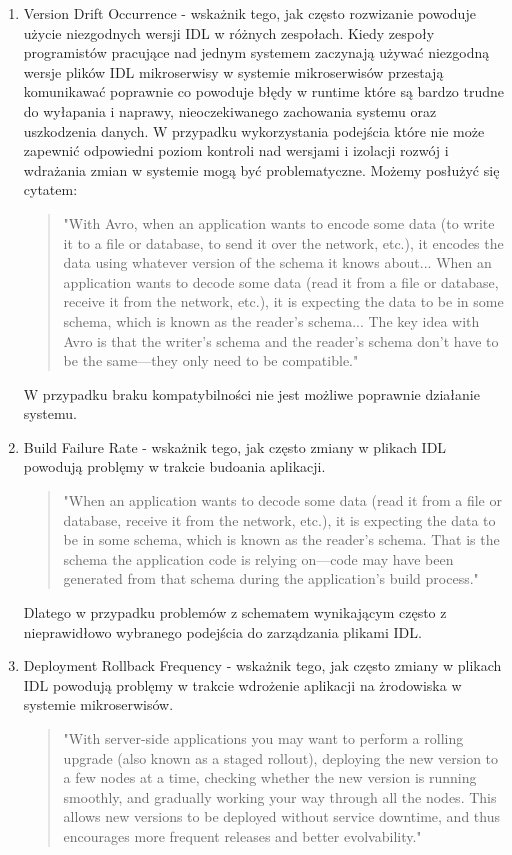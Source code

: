 \documentclass[runningheads,12pt]{llncs}
\begin{document}
\begin{enumerate}
    \item Version Drift Occurrence - wskażnik tego, jak często rozwizanie powoduje użycie niezgodnych wersji IDL w różnych zespołach. Kiedy zespoły programistów pracujące nad jednym systemem zaczynają używać niezgodną wersje plików IDL mikroserwisy w systemie mikroserwisów przestają komunikawać poprawnie co powoduje błędy w runtime które są bardzo trudne do wyłapania i naprawy, nieoczekiwanego zachowania systemu oraz uszkodzenia danych. W przypadku wykorzystania podejścia które nie może zapewnić odpowiedni poziom kontroli nad wersjami i izolacji rozwój i wdrażania zmian w systemie mogą być problematyczne. Możemy posłużyć się cytatem:
    \begin{quote}
        "With Avro, when an application wants to encode some data (to write it to a file or database, to send it over the network, etc.), it encodes the data using whatever version of the schema it knows about... When an application wants to decode some data (read it from a file or database, receive it from the network, etc.), it is expecting the data to be in some schema, which is known as the reader’s schema... The key idea with Avro is that the writer’s schema and the reader’s schema don’t have to be the same—they only need to be compatible." ~\cite[p. 123]{kleppmann2017designing}
    \end{quote}
    W przypadku braku kompatybilności nie jest możliwe  poprawnie działanie systemu.
    \item Build Failure Rate - wskażnik tego, jak często zmiany w plikach IDL powodują problęmy w trakcie budoania aplikacji.
    \begin{quote}
        "When an application wants to decode some data (read it from a file or database, receive it from the network, etc.), it is expecting the data to be in some schema, which is known as the reader’s schema. That is the schema the application code is relying on—code may have been generated from that schema during the application’s build process." ~\cite[p. 123]{kleppmann2017designing}
    \end{quote}
    Dlatego w przypadku problemów z schematem wynikającym często z nieprawidłowo wybranego podejścia do zarządzania  plikami IDL.
    \item Deployment Rollback Frequency - wskażnik tego, jak często zmiany w plikach IDL powodują problęmy w trakcie wdrożenie aplikacji na żrodowiska w systemie mikroserwisów.
    \begin{quote}
        "With server-side applications you may want to perform a rolling upgrade (also known as a staged rollout), deploying the new version to a few nodes at a time, checking whether the new version is running smoothly, and gradually working your way through all the nodes. This allows new versions to be deployed without service downtime, and thus encourages more frequent releases and better evolvability." ~\cite[p. 92]{kleppmann2017designing}

\end{quote}
\end{enumerate}
\end{document}
